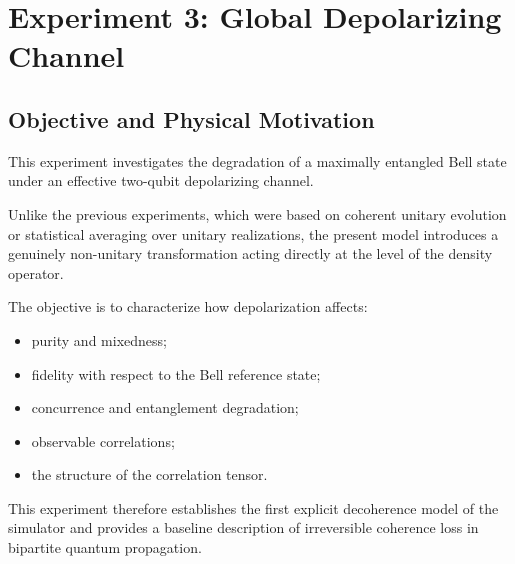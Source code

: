 
\newpage

\section{Experiment 3: Global Depolarizing Channel}
\label{sec:global_depolarizing_channel}


\subsection*{Objective and Physical Motivation}

This experiment investigates the degradation of a maximally entangled Bell state under an effective two-qubit depolarizing channel.

Unlike the previous experiments, which were based on coherent unitary evolution or statistical averaging over unitary realizations, the present model introduces a genuinely non-unitary transformation acting directly at the level of the density operator.

The objective is to characterize how depolarization affects:

\begin{itemize}
    \item purity and mixedness;
    \item fidelity with respect to the Bell reference state;
    \item concurrence and entanglement degradation;
    \item observable correlations;
    \item the structure of the correlation tensor.
\end{itemize}

This experiment therefore establishes the first explicit decoherence model of the simulator and provides a baseline description of irreversible coherence loss in bipartite quantum propagation.


